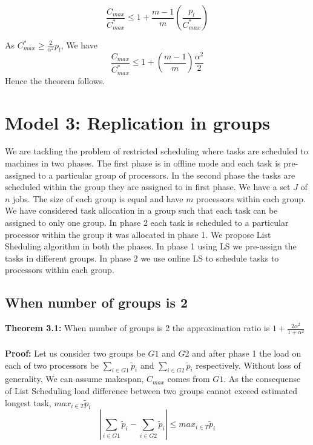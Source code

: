 \documentclass[10pt, conference, compsocconf]{IEEEtran}
\begin{document}
\begin{equation}\nonumber
\frac{C_{max}}{C_{max}^{*}} \leq 1 + {\frac{m-1}{m}}(\frac{p_l}{C_{max}^{*}})
\end{equation}

As $C_{max}^{*} \geq {\frac{2}{\alpha^{2}}} p_l $, We have \\

\begin{equation}\nonumber
\frac{C_{max}}{C_{max}^{*}} \leq 1 + (\frac{m-1}{m})\frac{\alpha^{2}}{2}
\end{equation}
Hence the theorem follows.   \\                            



\section{Model 3: Replication in groups}
We are tackling the  problem of restricted scheduling where tasks are scheduled to machines in two phases. The first phase is in offline mode and each task is pre-assigned to a particular  group of processors. In the second phase the tasks are scheduled  within the group they are assigned to in first phase.   We have a set $J$ of $ n$ jobs.  The size of each group is equal and have $m$ processors within each group.  We have considered task allocation in a group such that each task can be assigned to only one group.  In phase 2  each task is scheduled to a particular processor within the group it was allocated in phase 1.  We propose  List Sheduling algorithm in both the phases. In phase 1 using LS we pre-assign the tasks in different groups.  In phase 2 we use online LS to schedule tasks to processors within each group.

\subsection{When number of groups is 2}

\textbf{Theorem 3.1:} When number of groups is 2 the approximation ratio is $1 + \frac{2\alpha^{2}}{1+\alpha^{2}} $ \\
\\
\textbf{Proof:} 
 Let us consider two groups be $G1$ and $G2$ and after phase 1 the load on  each of two processors be $\sum_{i \in G1 }^{}{\tilde p_{i}}$ and $\sum_{i \in G2 }^{}{\tilde p_{i}}$ respectively. Without loss of generality, We can assume makespan, $C_{max}$ comes from $G1$.  As the consequense of List Scheduling load difference between two groups cannot exceed estimated longest task, ${max_{i \in T}}{\tilde p_{i}}$\\
\begin{equation}\nonumber
|\sum_{i \in G1 }^{}{\tilde p_{i}}- \sum_{i \in G2 }^{}{\tilde p_{i}}| \leq {max_{i \in T}}{\tilde p_{i}}\end{equation}
\end{document}
